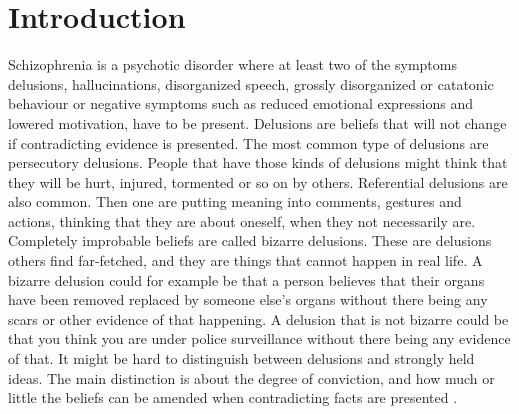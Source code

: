 \newpage
\chapter{Introduction}
Schizophrenia is a psychotic disorder where at least two of the symptoms delusions, hallucinations, disorganized speech, grossly disorganized or catatonic behaviour or negative symptoms such as reduced emotional expressions and lowered motivation, have to be present. 
Delusions are beliefs that will not change if contradicting evidence is presented. The most common type of delusions are persecutory delusions. People that have those kinds of delusions might think that they will be hurt, injured, tormented or so on by others. Referential delusions are also common. Then one are putting meaning into comments, gestures and actions, thinking that they are about oneself, when they not necessarily are. Completely improbable beliefs are called bizarre delusions. These are delusions others find far-fetched, and they are things that cannot happen in real life. A bizarre delusion could for example be that a person believes that their organs have been removed replaced by someone else's organs without there being any scars or other evidence of that happening. A delusion that is not bizarre could be that you think you are under police surveillance without there being any evidence of that. It might be hard to distinguish between delusions and strongly held ideas. The main distinction is about the degree of conviction, and how much or little the beliefs can be amended when contradicting facts are presented \citep{dsm-5}. 


